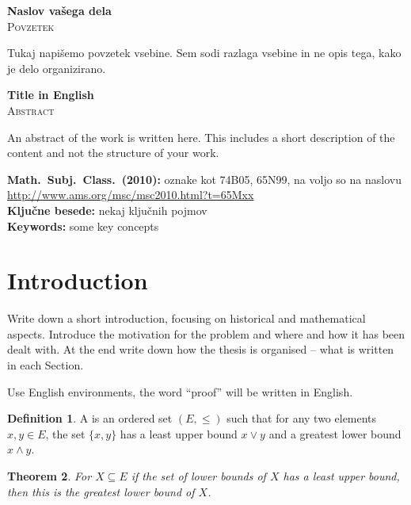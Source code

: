 \documentclass[12pt,a4paper,twoside]{article}
\newcommand{\naslovdela}{Naslov vašega dela}
\newcommand{\englishtitle}{Title in English}
\theoremstyle{definition} %
\newtheorem{definition}{Definition}[section]
\theoremstyle{plain} %
\newtheorem{theorem}[definition]{Theorem}
\numberwithin{equation}{section}  %
\begin{document}
\begin{center}
\textbf{\naslovdela} \\[3mm]
\textsc{Povzetek} \\[2mm]
\end{center}
Tukaj napišemo povzetek vsebine. Sem sodi razlaga vsebine in ne opis tega, kako je delo
organizirano.

\vfill
\begin{center}
\textbf{\englishtitle} \\[3mm] %
\textsc{Abstract}\\[2mm]
\end{center}

An abstract of the work is written here. This includes a short description of
the content and not the structure of your work.

\vfill\noindent
\textbf{Math.~Subj.~Class.~(2010):} oznake kot 74B05, 65N99, na voljo so na naslovu
\url{http://www.ams.org/msc/msc2010.html?t=65Mxx} \\[1mm]
\textbf{Ključne besede:} nekaj ključnih pojmov \\[1mm]
\textbf{Keywords:} some key concepts

\cleardoublepage

\setcounter{page}{1}    %

\section{Introduction}
Write down a short introduction, focusing on historical and mathematical aspects. Introduce the
motivation for the problem and where and how it has been dealt with. At the end write down how the
thesis is organised -- what is written in each Section.

Use English environments, the word ``proof'' will be written in English.
\begin{definition}
A \emph{} is an ordered set $(E, \leq)$ such that for any two elements $x,y \in E$,
the set $\{x,y\}$ has a least upper bound $x \vee y$ and a greatest lower bound $x \wedge y$.
\end{definition}

\begin{theorem}
For $X \subseteq E$ if the set of lower bounds of $X$ has a least upper bound, then this is the
greatest lower bound of $X$.
\end{theorem}
\end{document}
